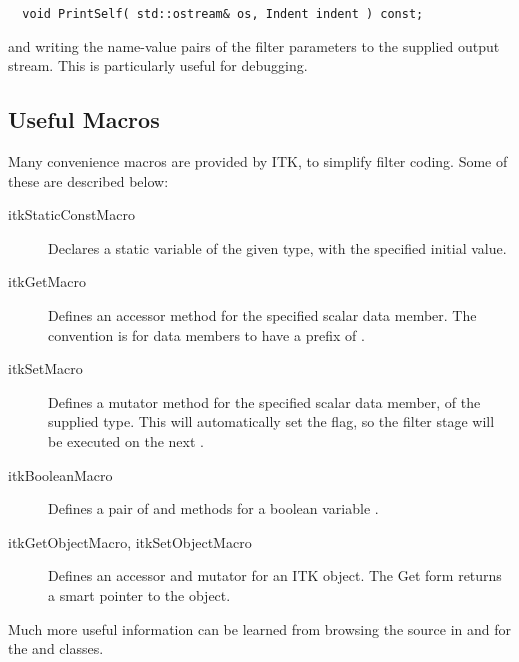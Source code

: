 \begin{verbatim}
  void PrintSelf( std::ostream& os, Indent indent ) const;
\end{verbatim}

\noindent and writing the name-value pairs of the filter parameters to the
supplied output stream.  This is particularly useful for debugging.

\subsection{Useful Macros}
\label{sec:UsefulMacros}

Many convenience macros are provided by ITK, to simplify filter coding. 
Some of these are described below:

\begin{description}
\item [itkStaticConstMacro] Declares a static variable of the given type,
  with the specified initial value. 
\item [itkGetMacro] Defines an accessor method for the specified scalar data
  member.  The convention is for data members to have a prefix of
  . 
\item [itkSetMacro] Defines a mutator method for the specified scalar data
  member, of the supplied type.  This will automatically set the
   flag, so the filter stage will be executed on the next
  . 
\item [itkBooleanMacro] Defines a pair of  and 
  methods for a boolean variable .
\item [itkGetObjectMacro, itkSetObjectMacro] Defines an accessor and mutator
  for an ITK object.  The Get form returns a smart pointer to the object.
\end{description}

Much more useful information can be learned from browsing the source in
 and for the  and
 classes. 



%
%



%
%
